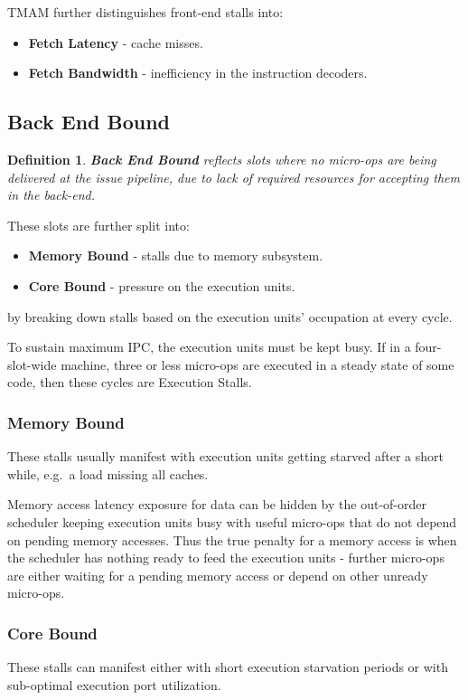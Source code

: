 \documentclass[11pt]{article}
\newtheorem{defn}{Definition}
\begin{document}
TMAM further distinguishes front-end stalls into:
\begin{itemize}
  \item \textbf{Fetch Latency} - cache misses.
  \item \textbf{Fetch Bandwidth} - inefficiency in the instruction decoders.
\end{itemize}

\subsection{Back End Bound}
\begin{defn}
  \textbf{Back End Bound} reflects slots where no micro-ops are being delivered at the issue pipeline, due to lack of required resources for accepting them in the back-end.
\end{defn}

These slots are further split into:
\begin{itemize}
  \item \textbf{Memory Bound} - stalls due to memory subsystem.
  \item \textbf{Core Bound} - pressure on the execution units.
\end{itemize}
by breaking down stalls based on the execution units' occupation at every cycle.

To sustain maximum IPC, the execution units must be kept busy.
If in a four-slot-wide machine, three or less micro-ops are executed in a steady state of some code, then these cycles are Execution Stalls.

\subsubsection{Memory Bound}
These stalls usually manifest with execution units getting starved after a short while, e.g.\ a load missing all caches.

Memory access latency exposure for data can be hidden by the out-of-order scheduler keeping execution units busy with useful micro-ops that do not depend on pending memory accesses.
Thus the true penalty for a memory access is when the scheduler has nothing ready to feed the execution units - further micro-ops are either waiting for a pending memory access or depend on other unready micro-ops.

\subsubsection{Core Bound}
These stalls can manifest either with short execution starvation periods or with sub-optimal execution port utilization.
\end{document}

